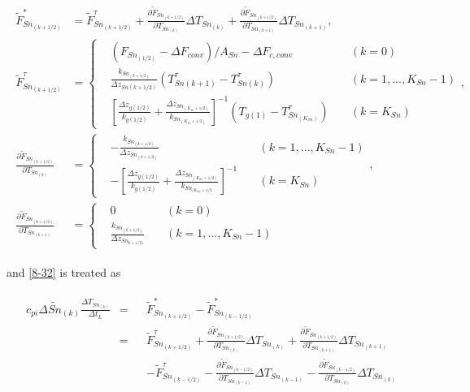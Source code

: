 \begin{eqnarray}
\begin{aligned}
\widetilde{F}_{Sn_{(k+1/2)}}^{\ast}
 &= \widetilde{F}_{Sn_{(k+1/2)}}^{\tau}
 + \frac{\partial \widetilde{F}_{Sn_{(k+1/2)}}}{\partial T_{Sn_{(k)}}} \Delta T_{Sn_{(k)}}
 + \frac{\partial \widetilde{F}_{Sn_{(k+1/2)}}}{\partial T_{Sn_{(k+1)}}} \Delta T_{Sn_{(k+1)}}, \\
\widetilde{F}_{Sn_{(k+1/2)}}^{\tau}
 &= \left\{ \begin{aligned}
 & (F_{Sn_{(1/2)}} - \Delta F_{conv}) / A_{Sn} - \Delta F_{c,conv}
 \; && (k = 0) \\
 & \frac{k_{Sn_{(k+1/2)}}}{\Delta z_{Sn(k+1/2)}} (T_{Sn(k+1)}^\tau - T_{Sn(k)}^\tau)
 \; && (k = 1, ..., K_{Sn}-1) \\
 & \left[
  \frac{\Delta z_{g(1/2)}}{k_{g(1/2)}}
  + \frac{\Delta z_{Sn_{(K_{Sn}+1/2)}}}{k_{Sn_{(K_{Sn}+1/2)}}}
 \right]^{-1} (T_{g(1)} - T_{Sn_{(K_{Sn})}}^\tau)
 \; && (k = K_{Sn})
\end{aligned} \right., \\
\frac{\partial \widetilde{F}_{Sn_{(k+1/2)}}}{\partial T_{Sn_{(k)}}}
 &= \left\{ \begin{aligned}
 & -\frac{k_{Sn_{(k+1/2)}}}{\Delta z_{Sn_{(k+1/2)}}}
 \; &&(k = 1, ..., K_{Sn}-1) \\
 & -\left[ \frac{\Delta z_{g(1/2)}}{k_{g(1/2)}}
  + \frac{\Delta z_{Sn_{(K_{Sn}+1/2)}}}{k_{Sn_{(K_{Sn}+1/2}}}
 \right]^{-1}
 \; &&(k = K_{Sn})
\end{aligned} \right., \\
\frac{\partial\widetilde{F}_{Sn_{(k+1/2)}}}{\partial T_{Sn_{(k+1)}}}
 &= \left\{ \begin{aligned}
 & 0
 \; &&(k = 0) \\
 & \frac{k_{Sn_{(k+1/2)}}}{\Delta z_{Sn_{k+1/2)}}}
 \; &&(k = 1, ..., K_{Sn}-1)
\end{aligned} \right.
\end{aligned} \label{8-38}
\end{eqnarray}

and \ref{8-32} is treated as

\begin{eqnarray}
\begin{aligned}
 c_{pi}\Delta \widetilde{Sn}_{(k)} \frac{\Delta T_{Sn_{(k)}}}{\Delta t_L}
 &= &&\widetilde{F}_{Sn_{(k+1/2)}}^{\ast} - \widetilde{F}_{Sn_{(k-1/2)}}^{\ast} \\
 &= &&\widetilde{F}_{Sn_{(k+1/2)}}^{\tau}
  + \frac{\partial \widetilde{F}_{Sn_{(k+1/2)}}}{\partial T_{Sn_{(k)}}}   \Delta T_{Sn_{(k)}}
  + \frac{\partial \widetilde{F}_{Sn_{(k+1/2)}}}{\partial T_{Sn_{(k+1)}}} \Delta T_{Sn_{(k+1)}} \\
 & &&- \widetilde{F}_{Sn_{(k-1/2)}}^{\tau}
  - \frac{\partial \widetilde{F}_{Sn_{(k-1/2)}}}{\partial T_{Sn_{(k-1)}}} \Delta T_{Sn_{(k-1)}}
  - \frac{\partial \widetilde{F}_{Sn_{(k-1/2)}}}{\partial T_{Sn_{(k)}}}   \Delta T_{Sn_{(k)}}
\end{aligned} \label{8-39}
\end{eqnarray}

